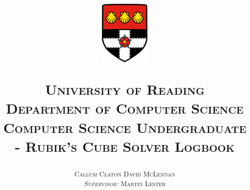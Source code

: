     \title{
        \centerline{\includegraphics[width = 25mm]{Uni.png}}
        \vspace{1.5cm}
        \textsc{\LARGE University of Reading}\\[0.25cm]
        \textsc{\Large Department of Computer Science}\\[1cm]
        \textsc{\large Computer Science Undergraduate - }
        \textsc{\large Rubik's Cube Solver Logbook}\\[0.75cm]
    }
    \author{
        \large
        \textsc{Callum Claton David McLennan}\\[0.25cm]
        \textsc{\normalsize \textit{Supervisor:} Martin Lester}\\[1cm]
    }
    \maketitle